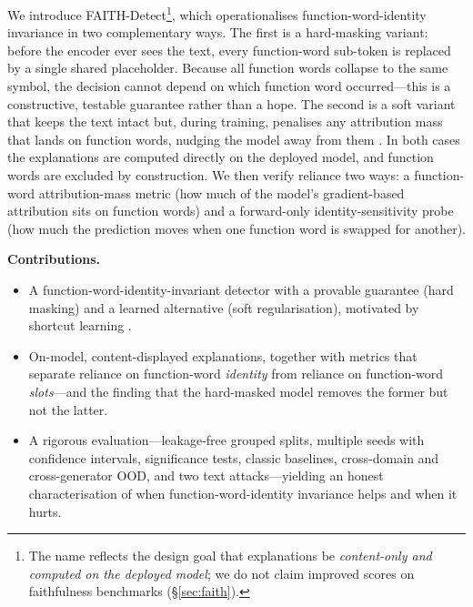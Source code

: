 \documentclass[10pt,twocolumn]{article}
\begin{document}
We introduce FAITH-Detect\footnote{The name reflects the design goal that explanations be \emph{content-only and computed on the deployed model}; we do not claim improved scores on faithfulness benchmarks (\S\ref{sec:faith}).}, which operationalises function-word-identity invariance in two complementary ways. The first is a hard-masking variant: before the encoder ever sees the text, every function-word sub-token is replaced by a single shared placeholder. Because all function words collapse to the same symbol, the decision cannot depend on which function word occurred---this is a constructive, testable guarantee rather than a hope. The second is a soft variant that keeps the text intact but, during training, penalises any attribution mass that lands on function words, nudging the model away from them \cite{ross}. In both cases the explanations are computed directly on the deployed model, and function words are excluded by construction. We then verify reliance two ways: a function-word attribution-mass metric (how much of the model's gradient-based attribution sits on function words) and a forward-only identity-sensitivity probe (how much the prediction moves when one function word is swapped for another).

\noindent\textbf{Contributions.}
\begin{itemize}
\item A function-word-identity-invariant detector with a provable guarantee (hard masking) and a learned alternative (soft regularisation), motivated by shortcut learning \cite{geirhos,gururangan,mccoy}.
\item On-model, content-displayed explanations, together with metrics that separate reliance on function-word \emph{identity} from reliance on function-word \emph{slots}---and the finding that the hard-masked model removes the former but not the latter.
\item A rigorous evaluation---leakage-free grouped splits, multiple seeds with confidence intervals, significance tests, classic baselines, cross-domain and cross-generator OOD, and two text attacks---yielding an honest characterisation of when function-word-identity invariance helps and when it hurts.
\end{itemize}
\end{document}
